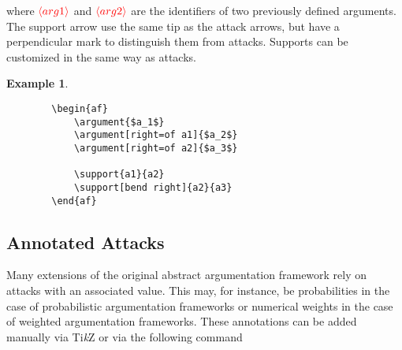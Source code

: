 \documentclass[headings=normal]{scrartcl}
\newcommand{\tikzname}{Ti\emph{k}Z\xspace}
\newcommand{\opt}[2][red]{\ensuremath{\textcolor{#1}{\langle #2\rangle}}}
\newtheorem{example}{Example}
\begin{document}
    \begin{list}{}{\leftmargin=\parindent\rightmargin=0pt}
    \item where \opt{arg1} and \opt{arg2} are the identifiers of two previously defined arguments.
    The support arrow use the same tip as the attack arrows, but have a perpendicular mark to distinguish them from attacks.
    Supports can be customized in the same way as attacks.
    \end{list}
    \begin{example}~

    \begin{minipage}{0.4\textwidth}
        \begin{center}
        \begin{af}
    
        \end{af}    
        \end{center}
    \end{minipage}%
    \begin{minipage}{0.5\textwidth}
        \begin{verbatim}
        \begin{af}
            \argument{$a_1$}
            \argument[right=of a1]{$a_2$}
            \argument[right=of a2]{$a_3$}
    
            \support{a1}{a2}
            \support[bend right]{a2}{a3}
        \end{af}
        \end{verbatim}
    \end{minipage}
    \end{example}


\subsection{Annotated Attacks}
    Many extensions of the original abstract argumentation framework rely on attacks with an associated value.
    This may, for instance, be probabilities in the case of probabilistic argumentation frameworks or numerical weights in the case of weighted argumentation frameworks.
    These annotations can be added manually via \tikzname or via the following command\\
    
\end{document}
